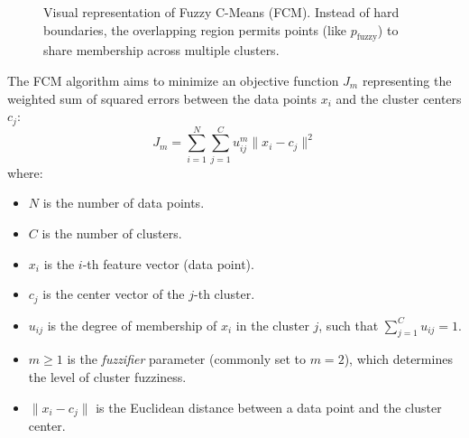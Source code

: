 \documentclass[openany]{book}
\begin{document}
\begin{figure}[htpb]
    \centering
    \caption{Visual representation of Fuzzy C-Means (FCM). Instead of hard boundaries, the overlapping region permits points (like $p_{\text{fuzzy}}$) to share membership across multiple clusters.}
\end{figure}

The FCM algorithm aims to minimize an objective function $J_m$ representing the weighted sum of squared errors between the data points $x_i$ and the cluster centers $c_j$:
\begin{equation}
    J_m = \sum_{i=1}^{N} \sum_{j=1}^{C} u_{ij}^m \| x_i - c_j \|^2
\end{equation}
where:
\begin{itemize}
    \item $N$ is the number of data points.
    \item $C$ is the number of clusters.
    \item $x_i$ is the $i$-th feature vector (data point).
    \item $c_j$ is the center vector of the $j$-th cluster.
    \item $u_{ij}$ is the degree of membership of $x_i$ in the cluster $j$, such that $\sum_{j=1}^C u_{ij} = 1$.
    \item $m \ge 1$ is the \textit{fuzzifier} parameter (commonly set to $m=2$), which determines the level of cluster fuzziness.
    \item $\| x_i - c_j \|$ is the Euclidean distance between a data point and the cluster center.
\end{itemize}
\end{document}

